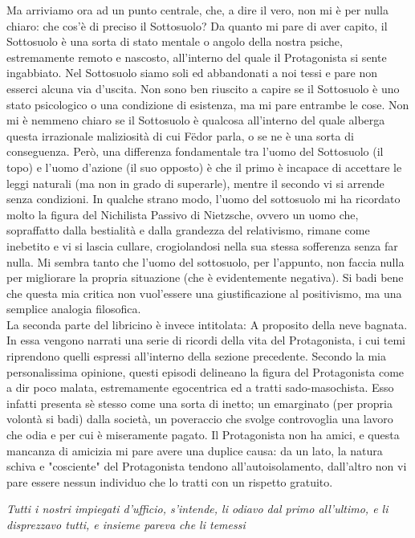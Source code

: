 \documentclass[12pt,a4paper]{report}
\theoremstyle{definition}
\theoremstyle{Theorem}
\theoremstyle{definition}
\theoremstyle{definition}
\theoremstyle{definition}
\begin{document}
Ma arriviamo ora ad un punto centrale, che, a dire il vero, non mi è per nulla chiaro: che cos'è di preciso il Sottosuolo? Da quanto mi pare di aver capito, il Sottosuolo è una sorta di stato mentale o angolo della nostra psiche, estremamente remoto e nascosto, all'interno del quale il Protagonista si sente ingabbiato. Nel Sottosuolo siamo soli ed abbandonati a noi tessi e pare non esserci alcuna via d'uscita. Non sono ben riuscito a capire se il Sottosuolo è uno stato psicologico o una condizione di esistenza, ma mi pare entrambe le cose. Non mi è nemmeno chiaro se il Sottosuolo è qualcosa all'interno del quale alberga questa irrazionale maliziosità di cui Fëdor parla, o se ne è una sorta di conseguenza. Però, una differenza fondamentale tra l'uomo del Sottosuolo (il topo) e l'uomo d'azione (il suo opposto) è che il primo è incapace di accettare le leggi naturali (ma non in grado di superarle), mentre il secondo vi si arrende senza condizioni. In qualche strano modo, l'uomo del sottosuolo mi ha ricordato molto la figura del Nichilista Passivo di Nietzsche, ovvero un uomo che, sopraffatto dalla bestialità e dalla grandezza del relativismo, rimane come inebetito e vi si lascia cullare, crogiolandosi nella sua stessa sofferenza senza far nulla. Mi sembra tanto che l'uomo del sottosuolo, per l'appunto, non faccia nulla per migliorare la propria situazione (che è evidentemente negativa). Si badi bene che questa mia critica non vuol'essere una giustificazione al positivismo, ma una semplice analogia filosofica.\\
La seconda parte del libricino è invece intitolata: A proposito della neve bagnata. In essa vengono narrati una serie di ricordi della vita del Protagonista, i cui temi riprendono quelli espressi all'interno della sezione precedente. Secondo la mia personalissima opinione, questi episodi delineano la figura del Protagonista come a dir poco malata, estremamente egocentrica ed a tratti sado-masochista. Esso infatti presenta sè stesso come una sorta di inetto; un emarginato (per propria volontà si badi) dalla società, un poveraccio che svolge controvoglia una lavoro che odia e per cui è miseramente pagato. Il Protagonista non ha amici, e questa mancanza di amicizia mi pare avere una duplice causa: da un lato, la natura schiva e "cosciente" del Protagonista tendono all'autoisolamento, dall'altro non vi pare essere nessun individuo che lo tratti con un rispetto gratuito. 
\begin{center}
	\textit{Tutti i nostri impiegati d'ufficio, s'intende, li odiavo dal primo all'ultimo, e li disprezzavo tutti, e insieme pareva che li temessi}
\end{center}
\end{document}
